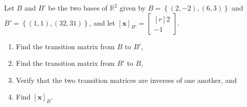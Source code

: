 \documentclass{article}
\theoremstyle{definition}
\begin{document}
\begin{exercise}
    Let $B$ and $B'$ be the two bases of $\mathbb{R}^2$ given by $B = \left\{ (2, -2), (6,3) \right\}$ and $B' = \left\{ (1,1), (32,31) \right\}$,  and let $\left[ \mathbf{x} \right]_{B'} = \begin{bmatrix*}[r] 2 \\ -1\end{bmatrix*}$.
    \begin{enumerate}
    \item Find the transition matrix from $B$ to $B'$, 
    \item Find the transition matrix from $B'$ to $B$, 
    \item Verify that the two transition matrices are inverses of one another, and 
    \item Find $\left[ \mathbf{x} \right]_{B}$.
    \end{enumerate}
\end{exercise}
\end{document}
